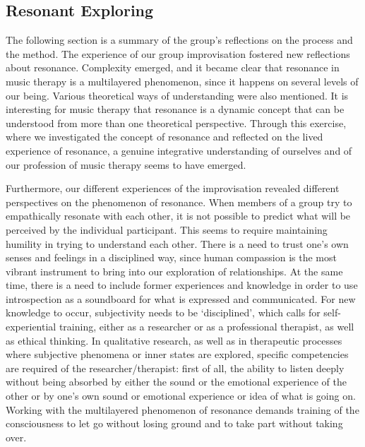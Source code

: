 \begin{adjmulticols}{2}{0mm}{0mm}
\section{Resonant Exploring}
The following section is a summary of the group’s reflections on the process and the method.  The experience of our group improvisation fostered new reflections about resonance. Complexity emerged, and it became clear that resonance in music therapy is a multilayered phenomenon, since it happens on several levels of our being. Various theoretical ways of understanding were also mentioned. It is interesting for music therapy that resonance is a dynamic concept that can be understood from more than one theoretical perspective. Through this exercise, where we investigated the concept of resonance and reflected on the lived experience of resonance, a genuine integrative understanding of ourselves and of our profession of music therapy seems to have emerged. 

Furthermore, our different experiences of the improvisation revealed different perspectives on the phenomenon of resonance. When members of a group try to empathically resonate with each other, it is not possible to predict what will be perceived by the individual participant. This seems to require maintaining humility in trying to understand each other. There is a need to trust one's own senses and feelings in a disciplined way, since human compassion is the most vibrant instrument to bring into our exploration of relationships. At the same time, there is a need to include former experiences and knowledge in order to use introspection as a soundboard for what is expressed and communicated. For new knowledge to occur, subjectivity needs to be ‘disciplined’, which calls for self-experiential training, either as a researcher or as a professional therapist, as well as ethical thinking. In qualitative research, as well as in therapeutic processes where subjective phenomena or inner states are explored, specific competencies are required of the researcher/therapist: first of all, the ability to listen deeply without being absorbed by either the sound or the emotional experience of the other or by one’s own sound or emotional experience or idea of what is going on. Working with the multilayered phenomenon of resonance demands training of the consciousness to let go without losing ground and to take part without taking over.


\end{adjmulticols}

